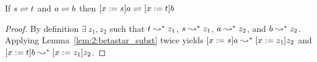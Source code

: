 \begin{lemma}
    If $s \rightleftharpoons t$ and $a \rightleftharpoons b$ then $[x := s]a \rightleftharpoons [x := t]b$
    \label{lem:2:betaconv_subst}
\end{lemma}
\begin{proof}
    By definition $\exists\ z_1, z_2$ such that $t \leadsto^* z_1$, $s \leadsto^* z_1$, $a \leadsto^* z_2$, and $b \leadsto^* z_2$.
    Applying Lemma~\ref{lem:2:betastar_subst} twice yields $[x := s]a \leadsto^* [x := z_1]z_2$ and $[x := t]b \leadsto^* [x := z_1]z_2$.
\end{proof}
